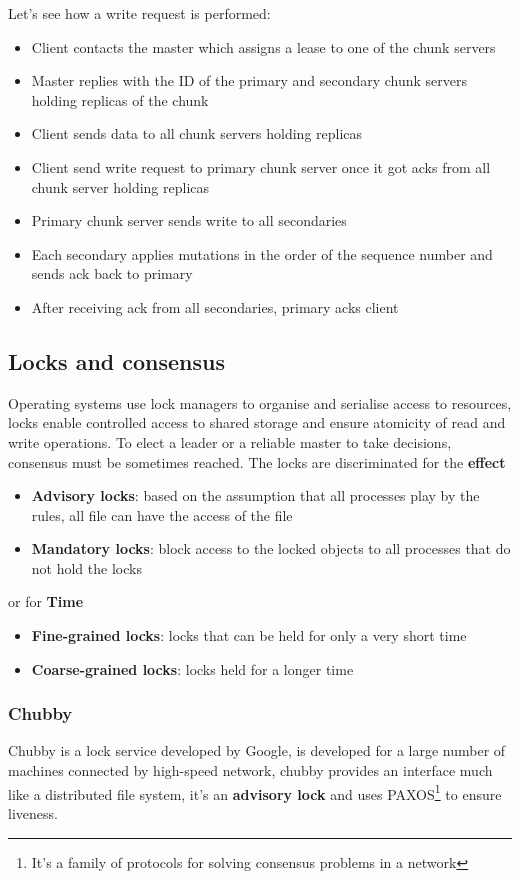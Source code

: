 Let's see how a write request is performed:
\begin{itemize}
    \item Client contacts the master which assigns a lease to one of the chunk servers 
    \item Master replies with the ID of the primary and secondary chunk servers holding replicas of the chunk
    \item Client sends data to all chunk servers holding replicas
    \item Client send write request to primary chunk server once it got acks from all chunk server holding replicas
    \item Primary chunk server sends write to all secondaries
    \item Each secondary applies mutations in the order of the sequence number and sends ack back to primary
    \item After receiving ack from all secondaries, primary acks client
\end{itemize}

\subsection{Locks and consensus}
Operating systems use lock managers to organise and serialise access to resources, locks enable controlled access to shared storage and ensure atomicity of read and write operations. To elect a leader or a reliable master to take decisions, consensus must be sometimes reached.
The locks are discriminated for the \textbf{effect}
\begin{itemize}
    \item \textbf{Advisory locks}: based on the assumption that all processes play by the rules, all file can have the access of the file
    \item \textbf{Mandatory locks}: block access to the locked objects to all processes that do not hold the locks
\end{itemize}
or for \textbf{Time}
\begin{itemize}
    \item \textbf{Fine-grained locks}: locks that can be held for only a very short time 
    \item \textbf{Coarse-grained locks}: locks held for a longer time
\end{itemize}

\subsubsection{Chubby}
Chubby is a lock service developed by Google, is developed for a large number of machines connected by high-speed network, chubby provides an interface much like a distributed file system, it's an \textbf{advisory lock} and uses PAXOS\footnote{It's a family of protocols for solving consensus problems in a network} to ensure liveness.

